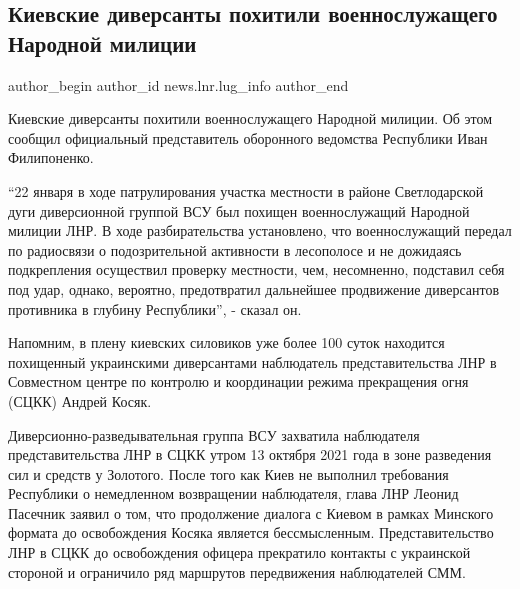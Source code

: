  
 
 
 
 
 
\subsection{Киевские диверсанты похитили военнослужащего Народной милиции}
\label{sec:23_01_2022.stz.news.lnr.lug_info.1.kiev_diversanty_pohischenie_nm_lnr}
 
\ifcmt
 author_begin
   author_id news.lnr.lug_info
 author_end
\fi

Киевские диверсанты похитили военнослужащего Народной милиции. Об этом сообщил
официальный представитель оборонного ведомства Республики Иван Филипоненко.

\enquote{22 января в ходе патрулирования участка местности в районе Светлодарской дуги
диверсионной группой ВСУ был похищен военнослужащий Народной милиции ЛНР. В
ходе разбирательства установлено, что военнослужащий передал по радиосвязи о
подозрительной активности в лесополосе и не дожидаясь подкрепления осуществил
проверку местности, чем, несомненно, подставил себя под удар, однако, вероятно,
предотвратил дальнейшее продвижение диверсантов противника в глубину
Республики}, - сказал он.


Напомним, в плену киевских силовиков уже более 100 суток находится похищенный
украинскими диверсантами наблюдатель представительства ЛНР в Совместном центре
по контролю и координации режима прекращения огня (СЦКК) Андрей Косяк.

Диверсионно-разведывательная группа ВСУ захватила наблюдателя представительства
ЛНР в СЦКК утром 13 октября 2021 года в зоне разведения сил и средств у
Золотого. После того как Киев не выполнил требования Республики о немедленном
возвращении наблюдателя, глава ЛНР Леонид Пасечник заявил о том, что
продолжение диалога с Киевом в рамках Минского формата до освобождения Косяка
является бессмысленным. Представительство ЛНР в СЦКК до освобождения офицера
прекратило контакты с украинской стороной и ограничило ряд маршрутов
передвижения наблюдателей СММ.

